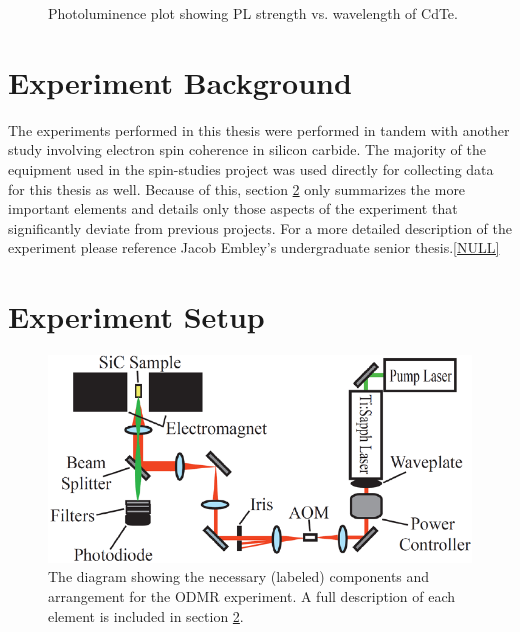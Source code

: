 \documentclass[oneside, astronomy, noacknowlegments]{BYUPhys}
\begin{document}
\begin{figure}
    \caption[Photoluminence Spectra of Cadmium Telluride]{\label{fig:CdTePL}
     Photoluminence plot showing PL strength vs. wavelength of CdTe.}
 \end{figure}

\section{Experiment Background}

The experiments performed in this thesis were performed in tandem with another study involving electron spin coherence in silicon carbide. The majority of the equipment used in the spin-studies project was used directly for collecting data for this thesis as well. Because of this, section \ref{sec:Experiment} only summarizes the more important elements and details only those aspects of the experiment that significantly deviate from previous projects. For a more detailed description of the experiment please reference Jacob Embley's undergraduate senior thesis.\ref{NULL}

\section{Experiment Setup}
\label{sec:Experiment}

\begin{figure}
    \centerline{\includegraphics{setup_fig}}
    \caption[Diagram of Experimental Setup for ODMR]{\label{fig:setup}
     The diagram showing the necessary (labeled) components and arrangement for the ODMR experiment. A full description of each element is included in section \ref{sec:Experiment}.}
 \end{figure}
\end{document}
